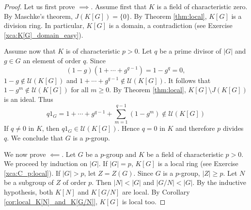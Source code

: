 \begin{proof}
    Let us first prove $\implies$. Assume first that $K$ is a field of characteristic zero. 
    By Maschke's theorem, $J(K[G])=\{0\}$. By Theorem \ref{thm:local}, 
    $K[G]$ is a division ring. In particular, $K[G]$ is a domain, 
    a contradiction (see Exercise \ref{xca:K[G]_domain_easy}).

    Assume now that $K$ is of characteristic $p>0$. 
    Let $q$ be a prime divisor of $|G|$ and $g\in G$ an element of order $q$. 
    Since 
    \[
    (1-g)(1+\cdots+g^{q-1})=1-g^q=0,
    \]
    $1-g\not\in\mathcal{U}(K[G])$ and $1+\cdots+g^{q-1}\not\in\mathcal{U}(K[G])$. It follows
    that $1-g^m\not\in\mathcal{U}(K[G])$ for all $m\geq0$. By Theorem \ref{thm:local}, 
    $K[G]\setminus J(K[G])$ is an ideal. Thus  
    \[
    q1_G=1+\cdots+g^{q-1}+\sum_{m=1}^{q-1}(1-g^m)\not\in\mathcal{U}(K[G])
    \]
    If $q\ne 0$ in $K$, then $q1_G\in\mathcal{U}(K[G])$. Hence $q=0$ in $K$ and
    therefore $p$ divides $q$. We conclude that $G$ is a $p$-group. 

    We now prove $\impliedby$. Let $G$ be a $p$-group and $K$ be a field of characteristic $p>0$. We proceed
    by induction on $|G|$. 
    If $|G|=p$, $K[G]$ is a local ring (see Exercise \ref{xca:C_p:local}).
    If $|G|>p$, let $Z=Z(G)$. Since $G$ is a $p$-group, $|Z|\geq p$. Let $N$ be a subgroup of $Z$ of order $p$. 
    Then $|N|<|G|$ and $|G/N|<|G|$. By the inductive hypothesis, both 
    $K[N]$ and $K[G/N]$ are local. By Corollary \ref{cor:local_K[N]_and_K[G/N]}, $K[G]$ is local too. 
\end{proof}
